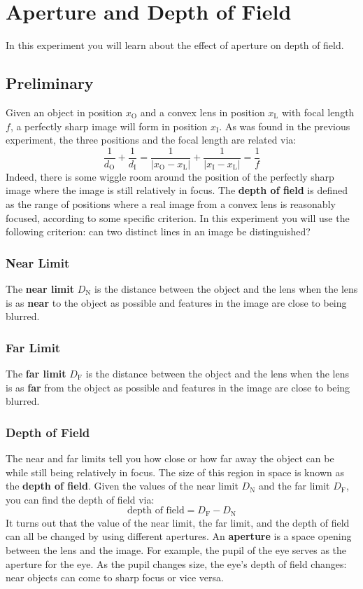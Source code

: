 \setcounter{chapter}{8}
\chapter{Aperture and Depth of Field}
%
In this experiment you will learn about the effect of aperture on depth of field.
%
\section{Preliminary}
%
Given an object in position $x_{\text{O}}$ and a convex lens in position $x_{\text{L}}$ with focal length $f$, a perfectly sharp image will form in position $x_{\text{I}}$. As was found in the previous experiment, the three positions and the focal length are related via:
\begin{equation}
    \frac{1}{d_{\text{O}}} + \frac{1}{d_{\text{I}}} = \frac{1}{\vert x_{\text{O}} - x_{\text{L}} \vert} + \frac{1}{\vert x_{\text{I}} - x_{\text{L}} \vert} = \frac{1}{f}
\end{equation}
Indeed, there is some wiggle room around the position of the perfectly sharp image where the image is still relatively in focus. The \textbf{depth of field} is defined as the range of positions where a real image from a convex lens is reasonably focused, according to some specific criterion. In this experiment you will use the following criterion: can two distinct lines in an image be distinguished?
%
\subsection{Near Limit}
%
The \textbf{near limit} $D_{\text{N}}$ is the distance between the object and the lens when the lens is as \textbf{near} to the object as possible and features in the image are close to being blurred.
%
\subsection{Far Limit}
%
The \textbf{far limit} $D_{\text{F}}$ is the distance between the object and the lens when the lens is as \textbf{far} from the object as possible and features in the image are close to being blurred.
%
\subsection{Depth of Field}
%
The near and far limits tell you how close or how far away the object can be while still being relatively in focus. The size of this region in space is known as the \textbf{depth of field}. Given the values of the near limit $D_{\text{N}}$ and the far limit $D_\text{{F}}$, you can find the depth of field via:
\begin{equation}
    \text{depth of field} = D_{\text{F}} - D_{\text{N}}
    \label{eq.09.dof}
\end{equation}
It turns out that the value of the near limit, the far limit, and the depth of field can all be changed by using different apertures. An \textbf{aperture} is a space opening between the lens and the image. For example, the pupil of the eye serves as the aperture for the eye. As the pupil changes size, the eye's depth of field changes: near objects can come to sharp focus or vice versa.
%
